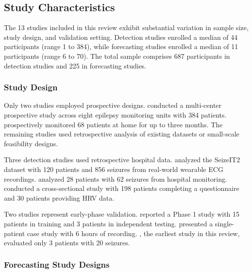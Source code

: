 \subsection{Study Characteristics}

The 13 studies included in this review exhibit substantial variation in sample size, study design, and validation setting. Detection studies enrolled a median of 44 participants (range 1 to 384), while forecasting studies enrolled a median of 11 participants (range 6 to 70). The total sample comprises 687 participants in detection studies and 225 in forecasting studies.

\subsubsection{Study Design}

Only two studies employed prospective designs. \textcite{spahrDeepLearningbasedDetection2025} conducted a multi-center prospective study across eight epilepsy monitoring units with 384 patients. \textcite{dongTwoLayerEnsembleMethod2022} prospectively monitored 68 patients at home for up to three months. The remaining studies used retrospective analysis of existing datasets or small-scale feasibility designs.

Three detection studies used retrospective hospital data. \textcite{reintjesECGBasedDetectionEpileptic2025} analyzed the SeizeIT2 dataset with 120 patients and 856 seizures from real-world wearable ECG recordings. \textcite{wangEpilepticSeizureDetection2025} analyzed 28 patients with 62 seizures from hospital monitoring. \textcite{elemamAutomatedValidatedTool2025} conducted a cross-sectional study with 198 patients completing a questionnaire and 30 patients providing HRV data.

Two studies represent early-phase validation. \textcite{fineDetectionKeyAutomated2025} reported a Phase 1 study with 15 patients in training and 3 patients in independent testing. \textcite{singhrathoreDevelopmentMultimodalMachine2024} presented a single-patient case study with 6 hours of recording. \textcite{borujenyDetectionEpilepticSeizure2013}, the earliest study in this review, evaluated only 3 patients with 20 seizures.

\subsubsection{Forecasting Study Designs}

